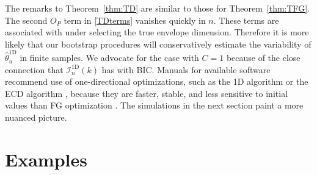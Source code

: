 \documentclass{article}\usepackage[]{graphicx}\usepackage[]{color}
\newcommand{\TD}{\widehat{\theta}^{\text{1D}}}
\newcommand{\IoneD}{\mathcal{I}_n^{\text{1D}}}
\newcommand{\woneD}{w^{\text{1D}}}
\begin{document}
The remarks to Theorem~\ref{thm:TD} are similar to those for Theorem~\ref{thm:TFG}. The second $O_P$ term in \eqref{TDterms} vanishes quickly in $n$. These terms are associated with under selecting the true envelope dimension. Therefore it is more likely that our bootstrap procedures will conservatively estimate the variability of $\TD_u$ in finite samples.
We advocate for the case with $C = 1$ because of the close connection that $\IoneD(k)$ has with  \textsc{BIC}. %
Manuals for available software recommend use of one-directional optimizations, such as the 1D algorithm or the ECD algorithm \citep{cook2018fast}, because they are faster, stable, and less sensitive to initial values than FG optimization \citep{zeng2019TRES, zeng2020TRES}. The simulations in the next section paint a more nuanced picture.


\section{Examples}
\end{document}
